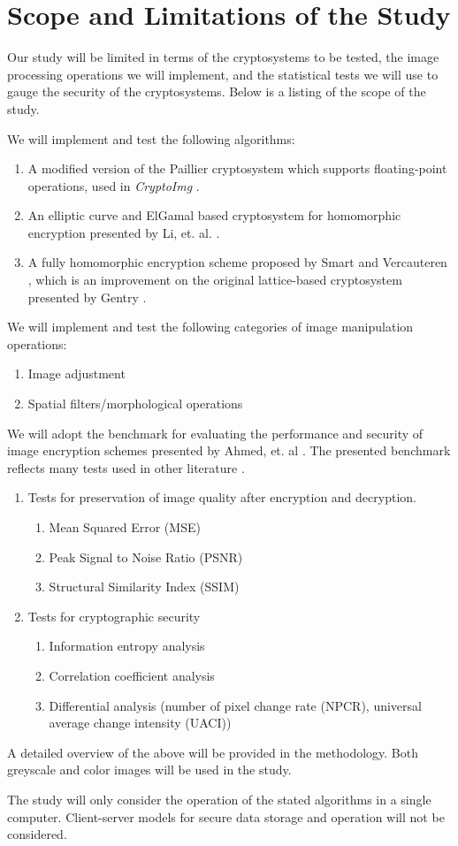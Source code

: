 \section{Scope and Limitations of the Study}
Our study will be limited in terms of the cryptosystems to be tested, the image processing operations we will implement, and the statistical tests we will use to gauge the security of the cryptosystems. Below is a listing of the scope of the study.

We will implement and test the following algorithms:
\begin{enumerate}
	\item A modified version of the Paillier cryptosystem \cite{stern_public-key_1999} which supports floating-point operations, used in \textit{CryptoImg} \cite{ziad_cryptoimg:_2016}.
	\item An elliptic curve and ElGamal based cryptosystem for homomorphic encryption presented by Li, et. al. \cite{li_elliptic_2012}.
	\item A fully homomorphic encryption scheme proposed by Smart and Vercauteren \cite{hutchison_fully_2010}, which is an improvement on the original lattice-based cryptosystem presented by Gentry \cite{gentry_fully_2009}.
\end{enumerate}
We will implement and test the following categories of image manipulation operations:
\begin{enumerate}
	\item Image adjustment
	\item Spatial filters/morphological operations
\end{enumerate}
We will adopt the benchmark for evaluating the performance and security of image encryption schemes presented by Ahmed, et. al \cite{ahmed_benchmark_2016}. The presented benchmark reflects many tests used in other literature \cite{ahmad_efficiency_2012, wu_npcr_2011}.
\begin{enumerate}
	\item Tests for preservation of image quality after encryption and decryption.
	\begin{enumerate}
		\item Mean Squared Error (MSE)
		\item Peak Signal to Noise Ratio (PSNR)
		\item Structural Similarity Index (SSIM)
	\end{enumerate}
	\item Tests for cryptographic security
	\begin{enumerate}
		\item Information entropy analysis
		\item Correlation coefficient analysis
		\item Differential analysis (number of pixel change rate (NPCR), universal average change intensity (UACI))
	\end{enumerate}
\end{enumerate}
A detailed overview of the above will be provided in the methodology.
Both greyscale and color images will be used in the study.

The study will only consider the operation of the stated algorithms in a single computer. Client-server models for secure data storage and operation will not be considered.
